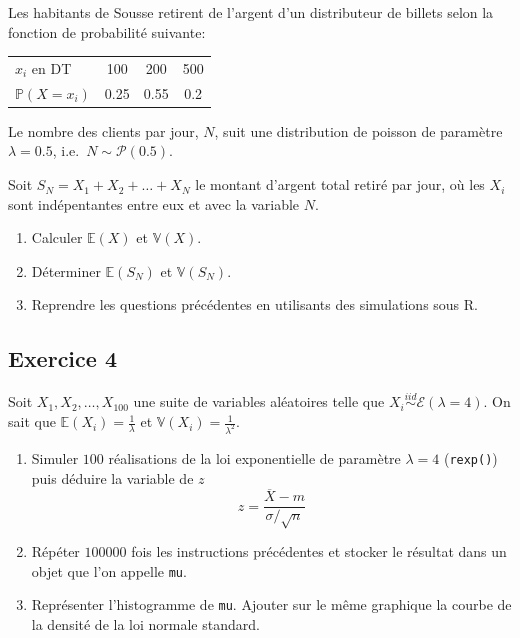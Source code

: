 \documentclass[
]{book}
\theoremstyle{definition}
\theoremstyle{definition}
\theoremstyle{definition}
\theoremstyle{remark}
\begin{document}
Les habitants de Sousse retirent de l'argent d'un distributeur de billets selon la fonction de probabilité suivante:

\begin{longtable}[]{@{}lccc@{}}
\toprule
\endhead
\(x_i\) en DT & 100 & 200 & 500\tabularnewline
\(\mathbb{P}(X=x_i)\) & 0.25 & 0.55 & 0.2\tabularnewline
\bottomrule
\end{longtable}

Le nombre des clients par jour, \(N\), suit une distribution de poisson de paramètre \(\lambda = 0.5\), i.e.~\(N \sim \mathcal{P}(0.5)\).

Soit \(S_N=X_1+X_2+\ldots +X_N\) le montant d'argent total retiré par jour, où les \(X_i\) sont indépentantes entre eux et avec la variable \(N\).

\begin{enumerate}
\def\labelenumi{\arabic{enumi}.}
\item
  Calculer \(\mathbb{E}(X)\) et \(\mathbb{V}(X)\).
\item
  Déterminer \(\mathbb{E}(S_N)\) et \(\mathbb{V}(S_N)\).
\item
  Reprendre les questions précédentes en utilisants des simulations sous R.
\end{enumerate}

\hypertarget{exercice-4}{%
\subsection*{Exercice 4}\label{exercice-4}}

Soit \(X_1, X_2,\ldots, X_{100}\) une suite de variables aléatoires telle que \(X_i \stackrel{iid}{\sim}\mathcal{E(\lambda=4)}\). On sait que \(\mathbb{E}(X_i)=\frac{1}{\lambda}\) et \(\mathbb{V}(X_i)=\frac{1}{\lambda^2}\).

\begin{enumerate}
\def\labelenumi{\arabic{enumi}.}
\item
  Simuler \(100\) réalisations de la loi exponentielle de paramètre \(\lambda=4\) (\texttt{rexp()}) puis déduire la variable de \(z\)
  \[z=\dfrac{\overline{X}-m}{\sigma/\sqrt{n}} \]
\item
  Répéter \(100000\) fois les instructions précédentes et stocker le résultat dans un objet que l'on appelle \texttt{mu}.
\item
  Représenter l'histogramme de \texttt{mu}. Ajouter sur le même graphique la courbe de la densité de la loi normale standard.
\end{enumerate}
\end{document}
